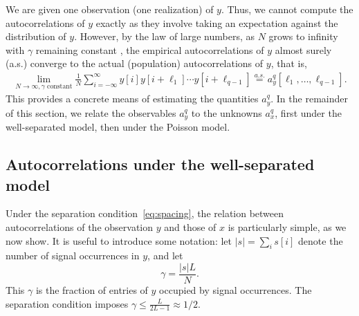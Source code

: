 \documentclass[12pt]{article}
\newcommand{\1}{\mathbf{1}}
\newcommand{\TODO}[1]{{\color{red}{[#1]}}}
\newcommand{\aseq}{\stackrel{a.s.}{=}}
\theoremstyle{plain}
\theoremstyle{definition}
\theoremstyle{remark}
\theoremstyle{plain}
\theoremstyle{remark}
\theoremstyle{plain}
\theoremstyle{plain}
\theoremstyle{plain}
\numberwithin{equation}{section}
\begin{document}
We are given one observation (one realization) of $y$. Thus, we cannot compute the autocorrelations of $y$ exactly as they involve taking an expectation against the distribution of $y$. However, by the law of large numbers, as $N$ grows to infinity with $\gamma$ remaining constant \TODO{We didn't define $\gamma$ for the well-separated model at this point; we should reconsider this}, the empirical autocorrelations of $y$ almost surely (a.s.) converge to the actual (population) autocorrelations of $y$, that is, %
\begin{align}
\lim_{N \to \infty, \gamma \textrm{ constant}} \frac{1}{N} \sum_{i=-\infty}^{\infty} y[i]y[i+\ell_1]\cdots y[i+\ell_{q-1}] \aseq a_y^q[\ell_1, \ldots, \ell_{q-1}].
\end{align}
\TODO{Why do we need constant $\gamma$?}
This provides a concrete means of estimating the quantities $a_y^ q$. In the remainder of this section, we relate the observables $a_y^q$  to the unknowns $a_x^q$, first under the well-separated model, then under the Poisson model.

\subsection{Autocorrelations under the well-separated model}

Under the separation condition~\eqref{eq:spacing}, the relation between autocorrelations of the observation $y$ and those of $x$ is particularly simple, as we now show. It is useful to introduce some notation: let $\vert s\vert = \sum_i s[i]$ denote the number of signal occurrences in $y$, and let
\begin{equation}
\gamma  = \frac{|s| L}{N}.
\label{eq:gamma}
\end{equation}
This $\gamma$ is the fraction of entries of $y$ occupied by signal occurrences. %
The separation condition  imposes $\gamma\leq\frac{L}{2L-1}\approx 1/2$. 
\end{document}

